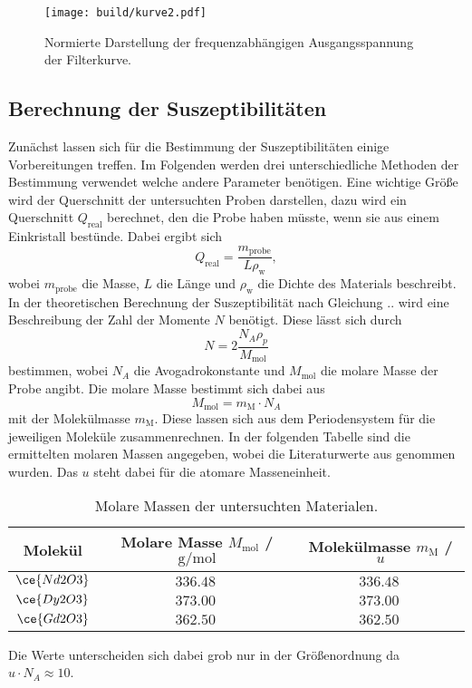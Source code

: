 \begin{figure}
    \centering
    \texttt{[image: build/kurve2.pdf]}
    \caption{Normierte Darstellung der frequenzabhängigen Ausgangsspannung der Filterkurve.} 
    \label{fig:kurve2}
\end{figure}

\newpage
\subsection{Berechnung der Suszeptibilitäten}
 
Zunächst lassen sich für die Bestimmung der Suszeptibilitäten einige Vorbereitungen treffen. Im Folgenden werden drei unterschiedliche Methoden der Bestimmung verwendet welche andere Parameter benötigen.
Eine wichtige Größe wird der Querschnitt der untersuchten Proben darstellen, dazu wird ein Querschnitt $Q_{\text{real}}$ berechnet, den die Probe haben müsste, wenn sie aus einem Einkristall bestünde. Dabei ergibt
sich \cite{skript}
\begin{equation}
    \label{eqn:qreal}
Q_{\text{real}} = \frac{m_{\text{probe}}}{L \rho_{\text{w}}},
\end{equation}
wobei $m_{\text{probe}}$ die Masse, $L$ die Länge und $\rho_{\text{w}}$ die Dichte des Materials beschreibt.
\\
In der theoretischen Berechnung der Suszeptibilität nach Gleichung .. wird eine Beschreibung der Zahl der Momente $N$ benötigt.
Diese lässt sich durch 
\begin{equation*}
N = 2\frac{N_{A} \rho_{p}}{M_{\text{mol}}}
\end{equation*}
bestimmen, wobei $N_{A}$ die Avogadrokonstante \cite{lit} und $M_{\text{mol}}$ die molare Masse der Probe angibt. Die molare Masse bestimmt sich dabei aus \cite{molar}
\begin{equation*}
    M_{\text{mol}} = m_{\text{M}} \cdot N_{A}
\end{equation*}
mit der Molekülmasse $m_{\text{M}}$. Diese lassen sich aus dem Periodensystem für die jeweiligen Moleküle zusammenrechnen. 
In der folgenden Tabelle sind die ermittelten molaren Massen angegeben, wobei die Literaturwerte aus \cite{lit2} genommen wurden. Das $u$ steht dabei für die atomare Masseneinheit.
\begin{table}
    \caption{Molare Massen der untersuchten Materialen.}
    \centering
    \label{tab:molmass}
    \begin{tabular}{c | c c}
        \toprule
        Molekül & Molare Masse $M_{\text{mol}}$ / $\si{\g\per\mol}$ & Molekülmasse $m_{\text{M}}$ / $u$ \\
        \midrule
        $\ce{Nd2O3}$ & $\SI{336.48}{}$      & $\SI{336.48}{}$\\
        $\ce{Dy2O3}$ & $\SI{373.00}{}$    & $\SI{373.00}{}$\\
        $\ce{Gd2O3}$ & $\SI{362.50}{}$    & $\SI{362.50}{}$\\
        \bottomrule    
    \end{tabular}
\end{table}
Die Werte unterscheiden sich dabei grob nur in der Größenordnung da $u \cdot N_{A} \approx 10$.

